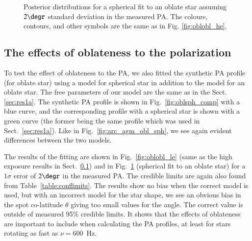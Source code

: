 \documentclass{aa}
\newcommand{\msun}{{M}_{\sun}}
\begin{document}


\begin{figure}
\caption{
Posterior distributions for a spherical fit to an oblate star assuming $2\degr$ standard deviation in the measured PA. 
The colours, contours, and other symbols are the same as in Fig. \ref{fig:oblobl_he}.
} 
\label{fig:oblsph_le}
\end{figure}


\subsection{The effects of oblateness to the polarization}\label{sec:res1b}

To test the effect of oblateness to the PA, we also fitted the synthetic PA profile (for oblate star) using a model for spherical star in addition to the model for an oblate star. 
The free parameters of our model are the same as in the Sect. \ref{sec:res1a}.
The synthetic PA profile is shown in Fig.~\ref{fig:oblsph_comp} with a blue curve, and the corresponding profile with a spherical star is shown with a green curve (the former being the same profile which was used in Sect.~\ref{sec:res1a}).
Like in Fig.~\ref{fig:arc_agm_obl_sph}, we see again evident differences between the two models.  

The results of the fitting are shown in Fig.~\ref{fig:oblobl_le} (same as the high exposure results in Sect.~\ref{sec:res1b}) and in Fig.~\ref{fig:oblsph_le}  (spherical fit to an oblate star) for a $1\sigma$ error of $2\degr$ in the measured PA.
The credible limits are again also found from Table~\ref{table:conflimits}.
The results show no bias when the correct model is used, but with an incorrect model for the star shape, we see an obvious bias in the spot co-latitude $\theta$  giving too small values for the angle.
The correct value is outside of measured 95\% credible limits.
It shows that the effects of oblateness are important to include when calculating the PA profiles, at least for stars rotating as fast as $\nu = 600$~Hz. 
\end{document}
